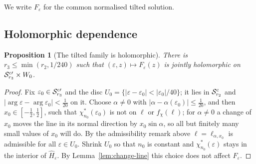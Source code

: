 \documentclass[11pt]{amsart}
\newtheorem{proposition}[theorem]{Proposition}
\theoremstyle{definition}
\begin{document}
We write $F_\varepsilon$ for the common normalised tilted solution.

\subsection{Holomorphic dependence}

\begin{proposition}[The tilted family is holomorphic]\label{prop:cusp-holo}
There is $r_3\le\min(r_2,1/240)$ such that $(\varepsilon,z)\mapsto F_\varepsilon(z)$ is jointly holomorphic on
$\mathcal S^{\rm c\prime}_{r_3}\times W_0$.
\end{proposition}

\begin{proof}
Fix $\varepsilon_0\in\mathcal S^{\rm c\prime}_{r_3}$ and the disc $U_0=\{|\varepsilon-\varepsilon_0|<|\varepsilon_0|/40\}$;
it lies in $\mathcal S^{\rm c}_{r_2}$ and $|\arg\varepsilon-\arg\varepsilon_0|<\tfrac1{20}$ on it.  Choose
$\alpha\ne0$ with $|\alpha-\alpha(\varepsilon_0)|\le\tfrac1{20}$, and then $x_0\in[-\tfrac12,\tfrac12]$, such that
$\chi^*_{n_0}(\varepsilon_0)$ is not on $\ell$ or $f_\chi(\ell)$; for $\alpha\ne0$ a change of $x_0$ moves the
line in its normal direction by $x_0\sin\alpha$, so all but finitely many small
values of $x_0$ will do.  By the admissibility remark above $\ell=\ell_{\alpha,x_0}$ is
admissible for all $\varepsilon\in U_0$.  Shrink $U_0$ so that $n_0$ is constant and
$\chi^*_{n_0}(\varepsilon)$ stays in the interior of $\hat H_\varepsilon$.  By Lemma~\ref{lem:change-line}
this choice does not affect $F_\varepsilon$.


\end{proof}
\end{document}
